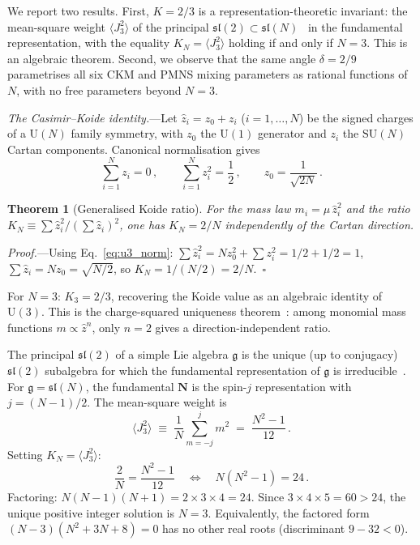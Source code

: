 \documentclass[aps,prl,twocolumn,showpacs,preprintnumbers,superscriptaddress]{revtex4-2}
\newcommand{\SU}{\mathrm{SU}}
\newcommand{\UU}{\mathrm{U}}
\newtheorem{theorem}{Theorem}
\begin{document}
We report two results.
First, $K = 2/3$ is a representation-theoretic invariant:
the mean-square weight $\langle J_3^2\rangle$ of the principal
$\mathfrak{sl}(2) \subset \mathfrak{sl}(N)$~\cite{Kostant:1959}
in the fundamental representation, with the equality
$K_N = \langle J_3^2\rangle$ holding if and only if $N = 3$.
This is an algebraic theorem.
Second, we observe that the same angle $\delta = 2/9$
parametrises all six CKM and PMNS mixing parameters as rational
functions of $N$, with no free parameters beyond $N = 3$.


\textit{The Casimir--Koide identity.}---Let
$\hat{z}_i = z_0 + z_i$ ($i = 1,\ldots,N$) be the signed
charges of a $\UU(N)$ family symmetry, with $z_0$ the $\UU(1)$
generator and $z_i$ the $\SU(N)$ Cartan components.
Canonical normalisation gives
\begin{equation}
  \sum_{i=1}^{N} z_i = 0\,,\qquad
  \sum_{i=1}^{N} z_i^2 = \frac{1}{2}\,,\qquad
  z_0 = \frac{1}{\sqrt{2N}}\,.
  \label{eq:u3_norm}
\end{equation}

\begin{theorem}[Generalised Koide ratio]
\label{thm:KN}
For the mass law $m_i = \mu\,\hat{z}_i^2$ and the ratio
$K_N \equiv \sum\hat{z}_i^2 / (\sum\hat{z}_i)^2$,
one has $K_N = 2/N$ independently of the Cartan direction.
\end{theorem}

\noindent\textit{Proof.}---Using Eq.~\eqref{eq:u3_norm}:
$\sum\hat{z}_i^2 = Nz_0^2 + \sum z_i^2 = 1/2 + 1/2 = 1$,
$\sum\hat{z}_i = Nz_0 = \sqrt{N/2}$,
so $K_N = 1/(N/2) = 2/N$.~$\square$

For $N = 3$: $K_3 = 2/3$, recovering the Koide value as
an algebraic identity of $\UU(3)$.
This is the charge-squared uniqueness
theorem~\cite{Koide:1983,Rivero:2024}: among monomial mass
functions $m \propto \hat{z}^n$, only $n = 2$ gives a
direction-independent ratio.

The principal $\mathfrak{sl}(2)$ of a simple Lie algebra
$\mathfrak{g}$ is the unique (up to conjugacy)
$\mathfrak{sl}(2)$ subalgebra for which the fundamental
representation of $\mathfrak{g}$ is
irreducible~\cite{Kostant:1959}.
For $\mathfrak{g} = \mathfrak{sl}(N)$, the fundamental
$\mathbf{N}$ is the spin-$j$ representation with
$j = (N{-}1)/2$.
The mean-square weight is
\begin{equation}
  \langle J_3^2\rangle
  \;\equiv\; \frac{1}{N}\sum_{m=-j}^{j} m^2
  \;=\; \frac{N^2 - 1}{12}\,.
  \label{eq:J3sq}
\end{equation}
Setting $K_N = \langle J_3^2\rangle$:
\begin{equation}
  \frac{2}{N} = \frac{N^2 - 1}{12}
  \quad\Longleftrightarrow\quad
  \boxed{N(N^2-1) = 24}\,.
  \label{eq:diophantine}
\end{equation}
Factoring: $N(N{-}1)(N{+}1) = 2\times 3\times 4 = 24$.
Since $3\times 4\times 5 = 60 > 24$, the unique positive
integer solution is $N = 3$.
Equivalently, the factored form
$(N-3)(N^2 + 3N + 8) = 0$ has no other real roots
(discriminant $9 - 32 < 0$).
\end{document}
